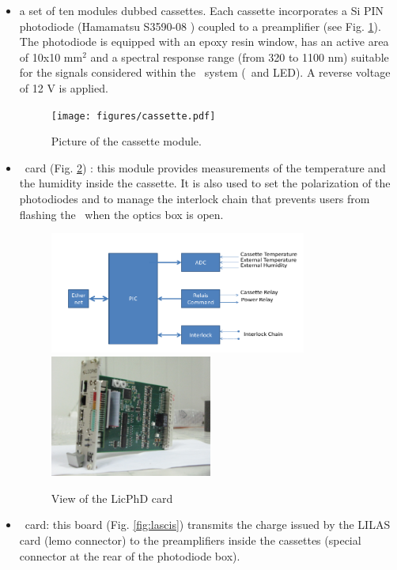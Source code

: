 \begin{itemize}
\item a set of ten modules dubbed cassettes. Each cassette incorporates a Si PIN photodiode (Hamamatsu S3590-08 \cite{ref:photodiode}) coupled to a preamplifier (see Fig. \ref{fig:cassette}). The photodiode is equipped with an epoxy resin window, has an active area of 10x10 mm$^{2}$ and a spectral response range (from 320 to 1100 nm) suitable for the signals considered within the \laserii~system (\laser~and LED). A reverse voltage of 12 V is applied.

\begin{figure}[htbp]
\centering
\texttt{[image: figures/cassette.pdf]}
\caption{Picture of the cassette module.}\label{fig:cassette}
\end{figure}

\item \licphd~card (Fig. \ref{fig:laslicphd}) : this module provides measurements of  the temperature and the humidity inside the cassette. It is also used to set the polarization of the photodiodes and to
manage the interlock chain that prevents users from flashing the \laser~when the optics box is open.

\begin{figure}[htbp]
\centering
\includegraphics[height=4cm]{figures/licphd_scheme.pdf}
\includegraphics[height=4cm]{figures/licphd.JPG}
\caption{View of the LicPhD card}\label{fig:laslicphd}
\end{figure}

\item \charinjsplit~card: this board (Fig. \ref{fig:lascis}) transmits the charge issued by the LILAS card (lemo connector) to the preamplifiers inside the cassettes (special connector at the rear of the photodiode box). 




\end{itemize}
